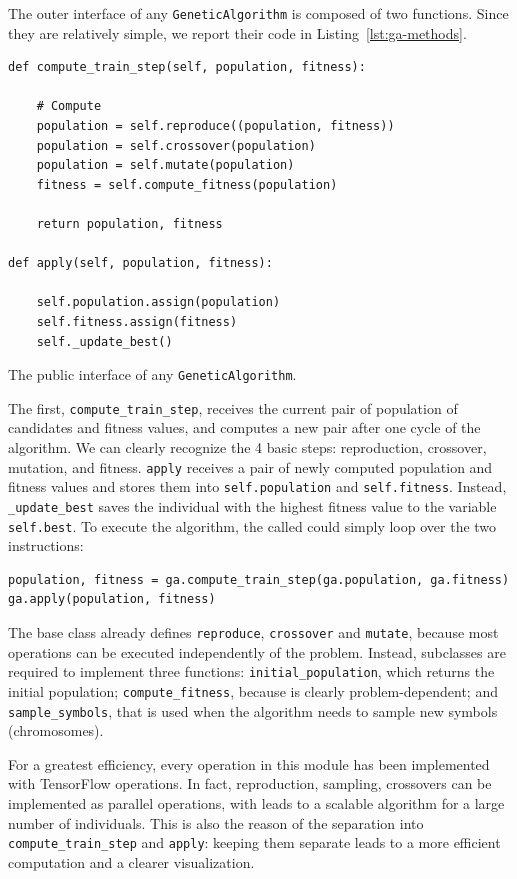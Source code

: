 The outer interface of any \texttt{GeneticAlgorithm} is composed of two
functions. Since they are relatively simple, we report their code in
Listing~\ref{lst:ga-methods}.
\begin{listing}
\begin{verbatim}
def compute_train_step(self, population, fitness):

	# Compute
	population = self.reproduce((population, fitness))
	population = self.crossover(population)
	population = self.mutate(population)
	fitness = self.compute_fitness(population)

	return population, fitness

def apply(self, population, fitness):

	self.population.assign(population)
	self.fitness.assign(fitness)
	self._update_best()
\end{verbatim}
\caption{The public interface of any \texttt{GeneticAlgorithm}.}
\label{lst:ga-methods}
\end{listing}
The first, \verb|compute_train_step|, receives the current pair of population
of candidates and fitness values, and computes a new pair after one cycle of
the algorithm. We can clearly recognize the 4 basic steps: reproduction,
crossover, mutation, and fitness. \verb|apply| receives a pair of newly
computed population and fitness values and stores them into
\verb|self.population| and \verb|self.fitness|. Instead, \verb|_update_best|
saves the individual with the highest fitness value to the variable
\verb|self.best|. To execute the algorithm, the called could simply loop
over the two instructions:
\begin{verbatim}
population, fitness = ga.compute_train_step(ga.population, ga.fitness)
ga.apply(population, fitness)
\end{verbatim}

The base class already defines \texttt{reproduce}, \texttt{crossover} and
\texttt{mutate}, because most operations can be executed independently of the
problem. Instead, subclasses are required to implement three functions:
\verb|initial_population|, which returns the initial population;
\verb|compute_fitness|, because is clearly problem-dependent; and
\verb|sample_symbols|, that is used when the algorithm needs to sample new
symbols (chromosomes).

For a greatest efficiency, every operation in this module has been implemented
with TensorFlow operations. In fact, reproduction, sampling, crossovers can be
implemented as parallel operations, with leads to a scalable algorithm for a
large number of individuals. This is also the reason of the separation into
\verb|compute_train_step| and \verb|apply|: keeping them separate leads to a
more efficient computation and a clearer visualization.

